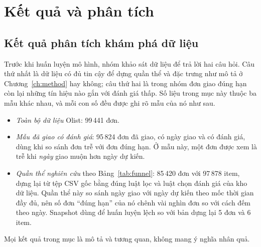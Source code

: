 \documentclass[12pt,a4paper]{report}
\begin{document}
\chapter{Kết quả và phân tích}\label{ch:results}

\section{Kết quả phân tích khám phá dữ liệu}\label{sec:eda}

Trước khi huấn luyện mô hình, nhóm khảo sát dữ liệu để trả lời hai câu hỏi. Câu thứ nhất là dữ liệu có đủ tin cậy để dựng quần thể và đặc trưng như mô tả ở Chương~\ref{ch:method} hay không; câu thứ hai là trong nhóm đơn giao đúng hạn còn lại những tín hiệu nào gắn với đánh giá thấp. Số liệu trong mục này thuộc ba mẫu khác nhau, và mỗi con số đều được ghi rõ mẫu của nó như sau.
\begin{itemize}
  \item \emph{Toàn bộ dữ liệu} Olist: 99\,441 đơn.
  \item \emph{Mẫu đã giao có đánh giá}: 95\,824 đơn đã giao, có ngày giao và có đánh giá, dùng khi so sánh đơn trễ với đơn đúng hạn. Ở mẫu này, một đơn được xem là trễ khi \emph{ngày} giao muộn hơn ngày dự kiến.
  \item \emph{Quần thể nghiên cứu} theo Bảng~\ref{tab:funnel}: 85\,420 đơn với 97\,878 item, dựng lại từ tệp CSV gốc bằng đúng luật lọc và luật chọn đánh giá của kho dữ liệu. Quần thể này so sánh ngày giao với ngày dự kiến theo mốc thời gian đầy đủ, nên số đơn ``đúng hạn'' của nó chênh vài nghìn đơn so với cách đếm theo ngày. Snapshot dùng để huấn luyện lệch so với bản dựng lại 5 đơn và 6 item.
\end{itemize}
Mọi kết quả trong mục là mô tả và tương quan, không mang ý nghĩa nhân quả.
\end{document}
